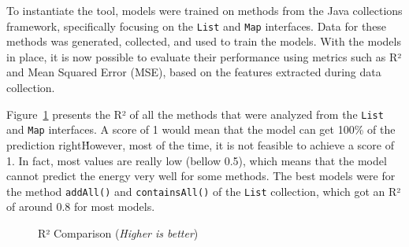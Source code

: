 To instantiate the tool, models were trained on methods from the Java collections framework, specifically focusing on the \texttt{List} and \texttt{Map} interfaces. Data for these methods was generated, collected, and used to train the models. With the models in place, it is now possible to evaluate their performance using metrics such as R² and Mean Squared Error (MSE), based on the features extracted during data collection.


Figure~\ref{fig:r2_comparison} presents the R² of all the methods that were analyzed from the \texttt{List} and \texttt{Map} interfaces. A score of 1 would mean that the model can get 100\% of the prediction right\. However, most of the time, it is not feasible to achieve a score of 1. In fact, most values are really low (bellow 0.5), which means that the model cannot predict the energy very well for some methods. The best models were for the method \texttt{addAll()} and \texttt{containsAll()} of the \texttt{List} collection, which got an R² of around 0.8 for most models.

\begin{figure}[htbp]
  \centering
  \caption{R² Comparison (\textit{Higher is better})}
  \label{fig:r2_comparison}
\end{figure}

